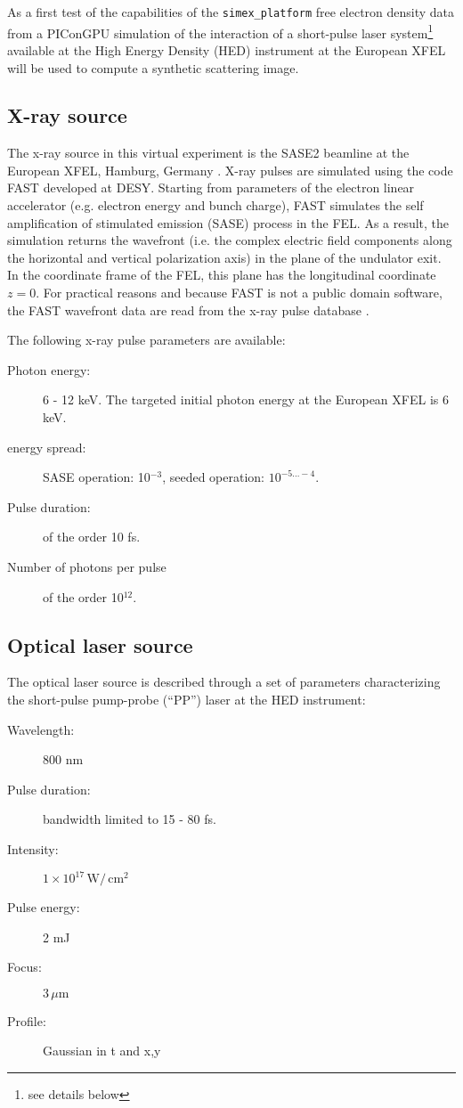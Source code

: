 \documentclass[a4paper]{article}
\begin{document}
As a first test of the capabilities of the \texttt{simex\_platform} free electron density data from a PIConGPU simulation of the interaction of a short-pulse laser system\footnote{see details below} available at the High Energy Density (HED) instrument \cite{Nakatsutsumi2014} at the European XFEL will be used to compute a synthetic scattering image.
%
\subsection{X-ray source}
The x-ray source in this virtual experiment is the SASE2 beamline at the European XFEL, Hamburg, Germany \cite{Tschentscher2011}.
X-ray pulses are simulated using the code FAST \cite{Saldin1999} developed at DESY. Starting from parameters of the electron linear accelerator
(e.g. electron energy and bunch charge), FAST simulates the self amplification of stimulated emission (SASE) process
\cite{Kim1986} in the
FEL. As a result, the simulation returns the wavefront (i.e. the complex electric field components
along the horizontal and vertical polarization axis) in the plane of the undulator exit. In the coordinate frame of the
FEL, this plane has the longitudinal coordinate $z=0$. For practical reasons and because FAST is not a public domain software,
the FAST wavefront data are read from the x-ray pulse database \cite{xpd_xfel}.

The following x-ray pulse parameters are available:
\begin{description}
  \item[Photon energy:] 6 - 12 keV. The targeted initial photon energy at the European XFEL is 6 keV.
  \item[energy spread:] SASE operation: 10$^{-3}$, seeded operation: $10^{-5\dots-4}$.
  \item[Pulse duration:] of the order 10 fs.
  \item[Number of photons per pulse] of the order 10$^{12}$.
\end{description}
%
\subsection{Optical laser source}
The optical laser source is described through a set of parameters characterizing the short-pulse pump-probe (``PP'') laser at the HED
instrument:
\begin{description}
  \item[Wavelength:] 800 nm
  \item[Pulse duration:] bandwidth limited to 15 - 80 fs.
  \item[Intensity:] $1\times 10^{17}\,\text{W}/\,\text{cm}^2$
  \item[Pulse energy:] 2 mJ
  \item[Focus:] $3\,\mu\text{m}$
  \item[Profile:] Gaussian in t and x,y
\end{description}
%
\end{document}
